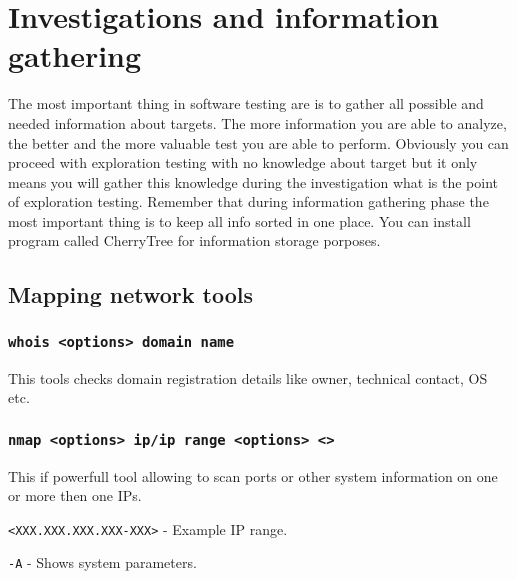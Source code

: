 \documentclass{article}[12pt]
\begin{document}




\section{Investigations and information gathering}
The most important thing in software testing are is to gather all possible and needed information about targets.
The more information you are able to analyze, the better and the more valuable test you are able to perform.
Obviously you can proceed with exploration testing with no knowledge about target but it only means you will gather this knowledge
during the investigation what is the point of exploration testing. Remember that during information gathering phase the most important thing is to keep all info sorted in one place. You can install
program called CherryTree for information storage porposes.


\subsection{Mapping network tools}

\subsubsection*{\texttt{whois <options> domain name}}
This tools checks domain registration details like owner, technical contact, OS etc.

\subsubsection*{\texttt{nmap <options> ip/ip range <options> <>}}
This if powerfull tool allowing to scan ports or other system information on one or more then one IPs.
\newline
\newline

\texttt{<XXX.XXX.XXX.XXX-XXX>} - Example IP range.
\newline

\texttt{-A} - Shows system parameters.
\newline
\end{document}

